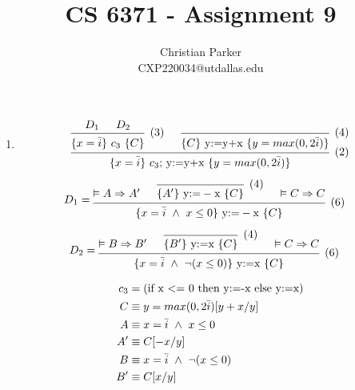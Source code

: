\documentclass{article}
\title{CS 6371 - Assignment 9}
\author{Christian Parker \\ CXP220034@utdallas.edu}
\begin{document}
\maketitle

\begin{enumerate}[1)]
    \item %
    \begin{align*}
        \begin{prooftree}
            \hypo{D_1}
            \hypo{D_2}
            \infer2[(3)]{\{x = \bar{i}\}\ c_3\ \{C\}}
            \infer0[(4)]{\{C\}\ \text{y:=y+x}\ \{y = max(0, 2 \bar{i})\}}
            \infer2[(2)]{\{x = \bar{i}\}\ c_3\text{; y:=y+x}\ \{y = max(0, 2 \bar{i})\}}
        \end{prooftree}
    \end{align*}

    \begin{align*}
        &D_1 =
        \begin{prooftree}
            \hypo{\vDash A \Rightarrow A'}
            \infer0[(4)]{\{A'\}\ \text{y:=}-\text{x}\ \{C\}}
            \hypo{\vDash C \Rightarrow C}
            \infer3[(6)]{\{x = \bar{i}\ \land\ x \leq 0\}\ \text{y:=}-\text{x}\ \{C\}}
        \end{prooftree}
    \end{align*}

    \begin{align*}
        &D_2 =
        \begin{prooftree}
            \hypo{\vDash B \Rightarrow B'}
            \infer0[(4)]{\{B'\}\ \text{y:=x}\ \{C\}}
            \hypo{\vDash C \Rightarrow C}
            \infer3[(6)]{\{x = \bar{i}\ \land\ \neg (x \leq 0)\}\ \text{y:=x}\ \{C\}}
        \end{prooftree}
    \end{align*}

    \begin{align*}
        c_3 &= \text{(if x \textless= 0 then y:=-x else y:=x)} \\
        C &\equiv y = max(0, 2 \bar{i})[y + x / y] \\
        A &\equiv x = \bar{i}\ \land\ x \leq 0 \\
        A' &\equiv C[-x/y] \\
        B &\equiv x = \bar{i}\ \land\ \neg(x \leq 0) \\
        B' &\equiv C[x/y]
    \end{align*}


\end{enumerate}
\end{document}
